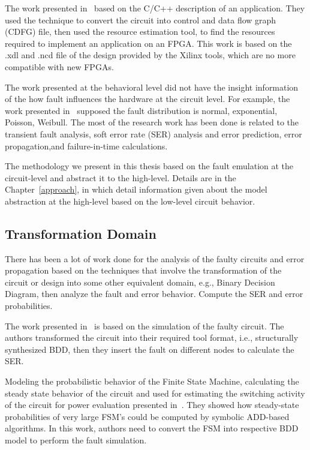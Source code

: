 The work presented in~\citep{thibeault2013library} based on the C/C++ description of an application. They used the technique to convert the circuit into control and data flow graph (CDFG) file, then used the resource estimation tool, to find the resources required to implement an application on an FPGA. This work is based on the .xdl and .ncd file of the design provided by the Xilinx tools, which are no more compatible with new FPGAs.


The work presented at the behavioral level did not have the insight information of the how fault influences the hardware at the circuit level. For example, the work presented in~\citep{janschek2017errorsim} supposed the fault distribution is normal, exponential, Poisson, Weibull. The most of the research work has been done is related to the transient fault analysis, soft error rate (SER) analysis and error prediction, error propagation,and failure-in-time calculations.


The methodology we present in this thesis based on the fault emulation at the circuit-level and abstract it to the high-level. Details are in the Chapter~\ref{approach}, in which detail information given about the model abstraction at the high-level based on the low-level circuit behavior.


\subsection{Transformation Domain}



There has been a lot of work done for the analysis of the faulty circuits and error propagation based on the techniques that involve the transformation of the circuit or design into some other equivalent domain, e.g., Binary Decision Diagram, then analyze the fault and error behavior. Compute the SER  and error probabilities.

The work presented in~\citep{ubar2014modeling} is based on the simulation of the faulty circuit.  The authors transformed the circuit into their required tool format, i.e., structurally synthesized BDD, then they
insert the fault on different nodes to calculate the SER. 


Modeling the probabilistic behavior of the Finite State Machine, calculating the steady state
behavior of the circuit and used for estimating the switching activity of the circuit for
power evaluation presented in~\citep{hachtel1996markovian}. They showed how steady-state probabilities of very large FSM’s could be computed by
symbolic ADD-based algorithms. In this work, authors need to convert the FSM into respective BDD model to perform the fault simulation.



